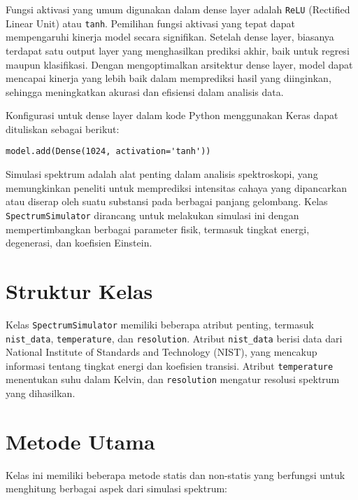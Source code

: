 \par Fungsi aktivasi yang umum digunakan dalam dense layer adalah \texttt{ReLU} (Rectified Linear Unit) atau \texttt{tanh}. Pemilihan fungsi aktivasi yang tepat dapat mempengaruhi kinerja model secara signifikan. Setelah dense layer, biasanya terdapat satu output layer yang menghasilkan prediksi akhir, baik untuk regresi maupun klasifikasi. Dengan mengoptimalkan arsitektur dense layer, model dapat mencapai kinerja yang lebih baik dalam memprediksi hasil yang diinginkan, sehingga meningkatkan akurasi dan efisiensi dalam analisis data.

\par Konfigurasi untuk dense layer dalam kode Python menggunakan Keras dapat dituliskan sebagai berikut:
\begin{minipage}{\textwidth}
\begin{verbatim}
model.add(Dense(1024, activation='tanh'))
\end{verbatim}
\end{minipage}

\par Simulasi spektrum adalah alat penting dalam analisis spektroskopi, yang memungkinkan peneliti untuk memprediksi intensitas cahaya yang dipancarkan atau diserap oleh suatu substansi pada berbagai panjang gelombang. Kelas \texttt{SpectrumSimulator} dirancang untuk melakukan simulasi ini dengan mempertimbangkan berbagai parameter fisik, termasuk tingkat energi, degenerasi, dan koefisien Einstein.

\section{Struktur Kelas}
\par Kelas \texttt{SpectrumSimulator} memiliki beberapa atribut penting, termasuk \texttt{nist\_data}, \texttt{temperature}, dan \texttt{resolution}. Atribut \texttt{nist\_data} berisi data dari National Institute of Standards and Technology (NIST), yang mencakup informasi tentang tingkat energi dan koefisien transisi. Atribut \texttt{temperature} menentukan suhu dalam Kelvin, dan \texttt{resolution} mengatur resolusi spektrum yang dihasilkan.

\section{Metode Utama}
\par Kelas ini memiliki beberapa metode statis dan non-statis yang berfungsi untuk menghitung berbagai aspek dari simulasi spektrum:

